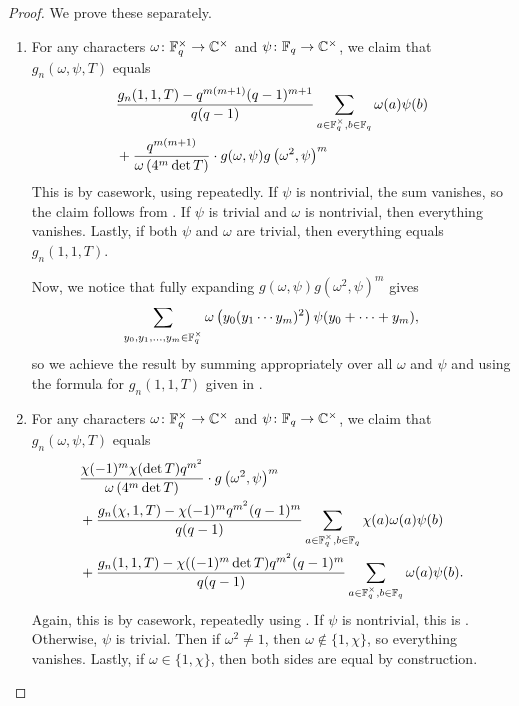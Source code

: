 \begin{proof}
    We prove these separately.
    \begin{enumerate}[label=(\alph*)]
        \item For any characters $\omega\colon\mathbb F_q^\times\to\mathbb C^\times$ and $\psi\colon\mathbb F_q\to\mathbb C^\times$, we claim that $g_n(\omega,\psi,T)$ equals
        \begin{align*}
            & \frac{g_n(1,1,T)-q^{m(m+1)}(q-1)^{m+1}}{q(q-1)}\sum_{a\in\mathbb F_q^\times,b\in\mathbb F_q}\omega(a)\psi(b) \\
            &+ \frac{q^{m(m+1)}}{\omega\left(4^m\det T\right)}\cdot g(\omega,\psi)g\left(\omega^2,\psi\right)^m
        \end{align*}
        This is by casework, using  repeatedly. If $\psi$ is nontrivial, the sum vanishes, so the claim follows from . If $\psi$ is trivial and $\omega$ is nontrivial, then everything vanishes. Lastly, if both $\psi$ and $\omega$ are trivial, then everything equals $g_n(1,1,T)$.

        Now, we notice that fully expanding $g(\omega,\psi)g\left(\omega^2,\psi\right)^m$ gives
        \[%
        \sum_{y_0,y_1,\ldots,y_m\in\FF_q^\times}\omega\left(y_0(y_1\cdots y_m)^2\right)\psi(y_0+\cdots+y_m),\]
        so we achieve the result by summing appropriately over all $\omega$ and $\psi$ and using the formula for $g_n(1,1,T)$ given in .

        \item For any characters $\omega\colon\mathbb F_q^\times\to\mathbb C^\times$ and $\psi\colon\mathbb F_q\to\mathbb C^\times$, we claim that $g_n(\omega,\psi,T)$ equals
        \begin{align*}
            &\frac{\chi(-1)^m\chi(\det T)q^{m^2}}{\omega\left(4^m\det T\right)}\cdot g\left(\omega^2,\psi\right)^m \\
            &+\frac{g_n(\chi,1,T)-\chi(-1)^mq^{m^2}(q-1)^m}{q(q-1)}\sum_{a\in\mathbb F_q^\times,b\in\mathbb F_q}\chi(a)\omega(a)\psi(b) \\
            &+\frac{g_n(1,1,T)-\chi((-1)^m\det T)q^{m^2}(q-1)^m}{q(q-1)}\sum_{a\in\mathbb F_q^\times,b\in\mathbb F_q}\omega(a)\psi(b).
        \end{align*}
        Again, this is by casework, repeatedly using . If $\psi$ is nontrivial, this is . Otherwise, $\psi$ is trivial. Then if $\omega^2\ne1$, then $\omega\notin\{1,\chi\}$, so everything vanishes. Lastly, if $\omega\in\{1,\chi\}$, then both sides are equal by construction.


\end{enumerate}
\end{proof}
